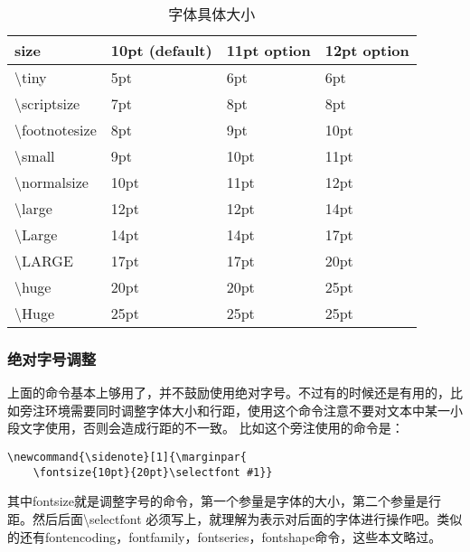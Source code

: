 \begin{table}[h]
\begin{tabular}{@{}llll@{}}
\toprule 
size          & 10pt (default) & 11pt option & 12pt option \\ \midrule
\textbackslash tiny         & 5pt            & 6pt         & 6pt         \\
\textbackslash scriptsize   & 7pt            & 8pt         & 8pt         \\
\textbackslash footnotesize & 8pt            & 9pt         & 10pt        \\
\textbackslash small        & 9pt            & 10pt        & 11pt        \\
\textbackslash normalsize   & 10pt           & 11pt        & 12pt        \\
\textbackslash large        & 12pt           & 12pt        & 14pt        \\
\textbackslash Large        & 14pt           & 14pt        & 17pt        \\
\textbackslash LARGE        & 17pt           & 17pt        & 20pt        \\
\textbackslash huge         & 20pt           & 20pt        & 25pt        \\
\textbackslash Huge         & 25pt           & 25pt        & 25pt        \\ \bottomrule
\end{tabular}
\label{tab:字体具体大小}
\caption{字体具体大小}
\end{table}


\subsubsection{绝对字号调整}
上面的命令基本上够用了，并不鼓励使用绝对字号。不过有的时候还是有用的，比如旁注环境需要同时调整字体大小和行距，使用这个命令注意不要对文本中某一小段文字使用，否则会造成行距的不一致。
比如这个旁注使用的命令是：
\begin{verbatim}
\newcommand{\sidenote}[1]{\marginpar{  
 	\fontsize{10pt}{20pt}\selectfont #1}}
\end{verbatim}
其中fontsize就是调整字号的命令，第一个参量是字体的大小，第二个参量是行距。然后后面\textbackslash selectfont 必须写上，就理解为表示对后面的字体进行操作吧。类似的还有fontencoding，fontfamily，fontseries，fontshape命令，这些本文略过。


